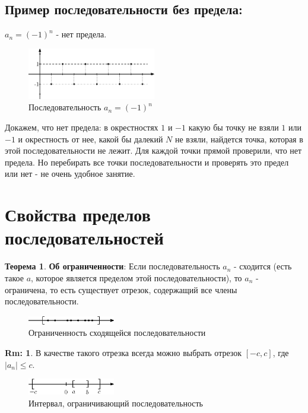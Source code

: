 \documentclass[12pt]{article}
\theoremstyle{definition}
\newtheorem{rem}{Rm:}
\newtheorem{theorem}{Теорема}
\begin{document}
	
\subsection*{Пример последовательности без предела:}
	
$a_n = (-1)^n$ - нет предела.

\begin{figure}[H]
	\centering
	\includegraphics[width=0.5\textwidth]{8_1.eps}
	\caption{Последовательность $a_n = (-1)^n$}
	\label{8_1}
\end{figure}	

Докажем, что нет предела: в окрестностях $1$ и $-1$ какую бы точку не взяли $1$ или $-1$ и окрестность от нее, какой бы далекий $N$ не взяли, найдется точка, которая в этой последовательности не лежит. Для каждой точки прямой проверили, что нет предела. Но перебирать все точки последовательности и проверять это предел или нет - не очень удобное занятие.

\section*{Свойства пределов последовательностей}

\begin{theorem}\textbf{Об ограниченности}:
	Если последовательность $a_n$ - сходится (есть такое $a$, которое является пределом этой последовательности), то $a_n$ - ограничена, то есть существует отрезок, содержащий все члены последовательности.
\end{theorem}

\begin{figure}[H]
	\centering
	\includegraphics[width=0.34\textwidth]{8_2.eps}
	\caption{Ограниченность сходящейся последовательности}
	\label{8_2}
\end{figure}	

\begin{rem}
	В качестве такого отрезка всегда можно выбрать отрезок $[-c,c]$, где $|a_n| \leq c$.
	
	\begin{figure}[H]
		\centering
		\includegraphics[width=0.34\textwidth]{8_3.eps}
		\caption{Интервал, ограничивающий последовательность}
		\label{8_4}
	\end{figure}
\end{rem}
\end{document}
